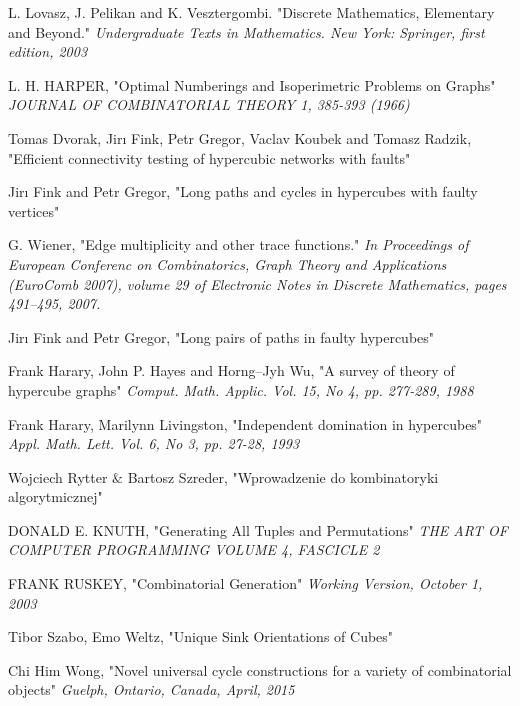 \documentclass{pracamgr}
\begin{document}
  
\begin{thebibliography}{99}%

   L. Lovasz, J. Pelikan and K. Vesztergombi.
   "Discrete Mathematics, Elementary and Beyond."
   \textit{Undergraduate Texts in Mathematics. New York: Springer, first edition, 2003}   

   L. H. HARPER,
   "Optimal Numberings and Isoperimetric Problems on Graphs"
   \textit{JOURNAL OF COMBINATORIAL THEORY 1, 385-393 (1966)}
   
   Tomas Dvorak, Jirı Fink, Petr Gregor, Vaclav Koubek and Tomasz Radzik,
   "Efficient connectivity testing of hypercubic networks with faults"
   
   Jirı Fink and Petr Gregor,
   "Long paths and cycles in hypercubes with faulty vertices"
   
    G. Wiener,
   "Edge multiplicity and other trace functions."
   \textit{In Proceedings of European Conferenc on Combinatorics, Graph Theory and Applications (EuroComb 2007), volume 29 of
   Electronic Notes in Discrete Mathematics, pages 491–495, 2007.}
   
   Jirı Fink and Petr Gregor,
   "Long pairs of paths in faulty hypercubes"
   

   
   Frank Harary, John P. Hayes and Horng--Jyh Wu,
   "A survey of theory of hypercube graphs"
   \textit{Comput. Math. Applic. Vol. 15, No 4, pp. 277-289, 1988}
   
   Frank Harary, Marilynn Livingston,
   "Independent domination in hypercubes"
   \textit{Appl. Math. Lett. Vol. 6, No 3, pp. 27-28, 1993}
   
   Wojciech Rytter $\&$ Bartosz Szreder,
   "Wprowadzenie do kombinatoryki algorytmicznej"
   
   DONALD E. KNUTH,
   "Generating All Tuples and Permutations"
   \textit{THE ART OF COMPUTER PROGRAMMING VOLUME 4, FASCICLE 2}
  
   FRANK RUSKEY,
   "Combinatorial Generation"
   \textit{Working Version, October 1, 2003}

   Tibor Szabo, Emo Weltz,
   "Unique Sink Orientations of Cubes"
   
   Chi Him Wong,
   "Novel universal cycle constructions for a variety of combinatorial objects"
   \textit{Guelph, Ontario, Canada, April, 2015}
   
\end{thebibliography}
\end{document}
